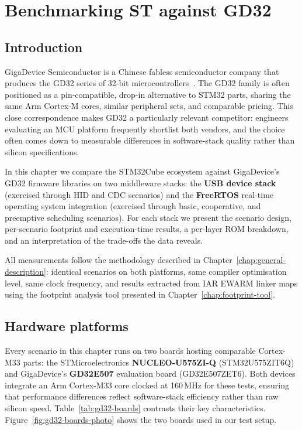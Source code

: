\chapter{Benchmarking ST against GD32}
\label{chap:vs-gd32}

\section*{Introduction}

GigaDevice Semiconductor is a Chinese fabless semiconductor company that produces the GD32
series of 32-bit microcontrollers~\cite{gigadevice-gd32}. The GD32 family is often
positioned as a pin-compatible, drop-in alternative to STM32 parts, sharing the same Arm
Cortex-M cores, similar peripheral sets, and comparable pricing. This close correspondence
makes GD32 a particularly relevant competitor: engineers evaluating an MCU platform
frequently shortlist both vendors, and the choice often comes down to measurable differences
in software-stack quality rather than silicon specifications.

In this chapter we compare the STM32Cube ecosystem against GigaDevice's GD32 firmware
libraries on two middleware stacks: the \textbf{USB device stack} (exercised through HID and
CDC scenarios) and the \textbf{FreeRTOS} real-time operating system integration (exercised
through basic, cooperative, and preemptive scheduling scenarios). For each stack we present
the scenario design, per-scenario footprint and execution-time results, a per-layer ROM
breakdown, and an interpretation of the trade-offs the data reveals.

All measurements follow the methodology described in
Chapter~\ref{chap:general-description}: identical scenarios on both platforms, same compiler
optimisation level, same clock frequency, and results extracted from IAR EWARM linker maps
using the footprint analysis tool presented in Chapter~\ref{chap:footprint-tool}.

\section{Hardware platforms}
\label{sec:gd32-boards}

Every scenario in this chapter runs on two boards hosting comparable Cortex-M33 parts: the
STMicroelectronics \textbf{NUCLEO-U575ZI-Q} (STM32U575ZIT6Q) and GigaDevice's
\textbf{GD32E507} evaluation board (GD32E507ZET6). Both devices integrate an Arm Cortex-M33
core clocked at 160\,MHz for these tests, ensuring that performance differences reflect
software-stack efficiency rather than raw silicon speed.
Table~\ref{tab:gd32-boards} contrasts their key characteristics.
Figure~\ref{fig:gd32-boards-photo} shows the two boards used in our test setup.

